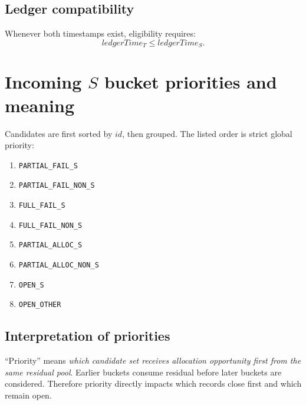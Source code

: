 \documentclass[sigconf]{acmart}
\begin{document}
\subsection{Ledger compatibility}
Whenever both timestamps exist, eligibility requires:
\[
ledgerTime_T \le ledgerTime_S.
\]

\section{Incoming $S$ bucket priorities and meaning}\label{sec:buckets}
Candidates are first sorted by $id$, then grouped.
The listed order is strict global priority:
\begin{enumerate}[leftmargin=*]
  \item \texttt{PARTIAL\_FAIL\_S}
  \item \texttt{PARTIAL\_FAIL\_NON\_S}
  \item \texttt{FULL\_FAIL\_S}
  \item \texttt{FULL\_FAIL\_NON\_S}
  \item \texttt{PARTIAL\_ALLOC\_S}
  \item \texttt{PARTIAL\_ALLOC\_NON\_S}
  \item \texttt{OPEN\_S}
  \item \texttt{OPEN\_OTHER}
\end{enumerate}

\subsection{Interpretation of priorities}
``Priority'' means \emph{which candidate set receives allocation opportunity first from the same residual pool}.
Earlier buckets consume residual before later buckets are considered.
Therefore priority directly impacts which records close first and which remain open.
\end{document}
